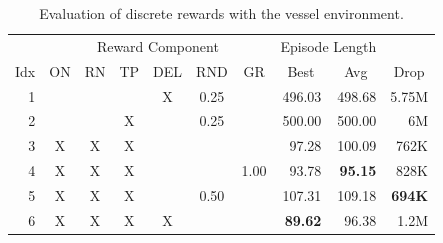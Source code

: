 \begin{table}[htp]
    \begin{center}
        \begin{tabular}{rccccccrrr}
            \toprule
             & \multicolumn{6}{c}{Reward Component} & \multicolumn{2}{c}{Episode Length} & \\
            \cmidrule(lr){2-7}\cmidrule(lr){8-9}
            \multicolumn{1}{c}{Idx} & \multicolumn{1}{c}{ON} & \multicolumn{1}{c}{RN} & \multicolumn{1}{c}{TP} & \multicolumn{1}{c}{DEL} & \multicolumn{1}{c}{RND} & \multicolumn{1}{c}{GR} & \multicolumn{1}{c}{Best} & \multicolumn{1}{c}{Avg} & \multicolumn{1}{c}{Drop}\\
            \midrule
            1 &  &  &  & X & 0.25 &  & 496.03 & 498.68 & 5.75M \\
            2 &  &  & X &  & 0.25 &  & 500.00 & 500.00 & 6M \\
            3 & X & X & X &  &  &  & 97.28 & 100.09 & 762K \\
            4 & X & X & X &  &  & 1.00 & 93.78 & \textbf{95.15} & 828K \\
            5 & X & X & X &  & 0.50 &  & 107.31 & 109.18 & \textbf{694K} \\
            6 & X & X & X & X &  &  & \textbf{89.62} & 96.38 & 1.2M \\
            \bottomrule
        \end{tabular}
    \end{center}
    \caption[Evaluation of Discrete Reward Evaluation with the Vessel Environment]{Evaluation of discrete rewards with the vessel environment.} \label{tab:VesselMaze02/Reward/Discrete}
\end{table}


